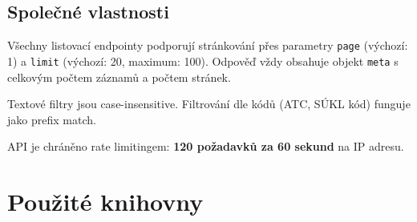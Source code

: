 \documentclass[12pt,a4paper]{article}
\begin{document}
\subsection{Společné vlastnosti}

Všechny listovací endpointy podporují stránkování přes parametry \texttt{page} (výchozí: 1) a \texttt{limit} (výchozí: 20, maximum: 100). Odpověď vždy obsahuje objekt \texttt{meta} s celkovým počtem záznamů a počtem stránek.

Textové filtry jsou case-insensitive. Filtrování dle kódů (ATC, SÚKL kód) funguje jako prefix match.

API je chráněno rate limitingem: \textbf{120 požadavků za 60 sekund} na IP adresu.

\section{Použité knihovny}
\end{document}
